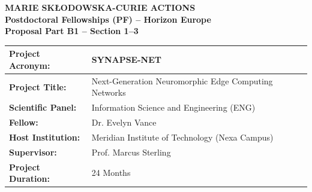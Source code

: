 \documentclass[11pt,a4paper]{article}
\begin{document}
\noindent
\begin{tcolorbox}[
  colback=white,
  colframe=MSCABlue,
  arc=3mm,
  boxrule=1.5pt,
  top=4mm, bottom=4mm, left=4mm, right=4mm
]
\begin{minipage}[c]{0.72\textwidth}
  {\fontsize{16}{20}\selectfont\bfseries\color{MSCABlue} MARIE SK{\L}ODOWSKA-CURIE ACTIONS} \\[1mm]
  {\fontsize{12}{14}\selectfont\bfseries\color{MSCAGold} Postdoctoral Fellowships (PF) -- Horizon Europe} \\[2mm]
  {\fontsize{10}{12}\selectfont\color{MSCADarkGray}\textbf{Proposal Part B1 -- Section 1--3}}
\end{minipage}\hfill
\begin{minipage}[c]{0.24\textwidth}
  \centering
\end{minipage}
\end{tcolorbox}

\vspace{0.3cm}

\noindent
\begin{tcolorbox}[
  colback=white,
  colframe=MSCABorder,
  arc=2mm,
  boxrule=1pt,
  top=3mm, bottom=3mm, left=4mm, right=4mm
]
\begin{tabularx}{\textwidth}{lX}
  \textbf{Project Acronym:} & SYNAPSE-NET \\ \midrule
  \textbf{Project Title:} & Next-Generation Neuromorphic Edge Computing Networks \\ \midrule
  \textbf{Scientific Panel:} & Information Science and Engineering (ENG) \\ \midrule
  \textbf{Fellow:} & Dr. Evelyn Vance \\ \midrule
  \textbf{Host Institution:} & Meridian Institute of Technology (Nexa Campus) \\ \midrule
  \textbf{Supervisor:} & Prof. Marcus Sterling \\ \midrule
  \textbf{Project Duration:} & 24 Months
\end{tabularx}
\end{tcolorbox}

\vspace{0.4cm}




\end{document}
